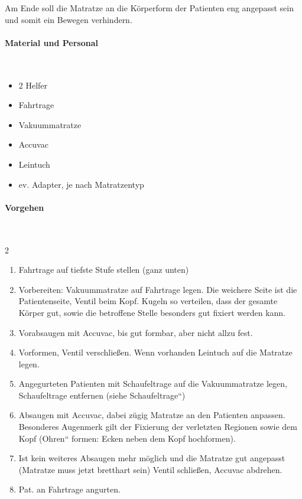 Am Ende soll die Matratze an die Körperform der Patienten eng
angepasst sein und somit ein Bewegen verhindern.

\paragraph*{Material und Personal}~

\begin{itemize}
    \item 2 Helfer
    \item Fahrtrage
    \item Vakuummatratze
    \item Accuvac
    \item Leintuch
    \item ev. Adapter, je nach Matratzentyp
\end{itemize}


\paragraph*{Vorgehen}~

\begin{multicols}{2}
\begin{enumerate}
    \item Fahrtrage auf tiefste Stufe stellen (ganz unten)
    \item Vorbereiten: Vakuummatratze auf Fahrtrage legen. Die weichere
    Seite ist die Patientenseite, Ventil beim Kopf. Kugeln so verteilen,
    dass der gesamte Körper gut, sowie die betroffene Stelle besonders gut
    fixiert werden kann.
    \item Vorabsaugen mit Accuvac, bis gut formbar, aber nicht allzu fest.
    \item Vorformen, Ventil verschließen. Wenn vorhanden Leintuch auf
    die Matratze legen.
    \item Angegurteten Patienten mit Schaufeltrage auf die Vakuummatratze
    legen, Schaufeltrage entfernen (siehe
    {\quotedblbase}Schaufeltrage{\textquotedblleft})
    \item Absaugen mit Accuvac, dabei zügig Matratze an den Patienten
    anpassen. Besonderes Augenmerk gilt der Fixierung der verletzten
    Regionen sowie dem Kopf ({\quotedblbase}Ohren{\textquotedblleft}
    formen: Ecken neben dem Kopf hochformen).
    \item Ist kein weiteres Absaugen mehr möglich und die Matratze gut
    angepasst (Matratze muss jetzt bretthart sein) Ventil schließen,
    Accuvac abdrehen.
    \item Pat. an Fahrtrage angurten.
\end{enumerate}
\end{multicols}

